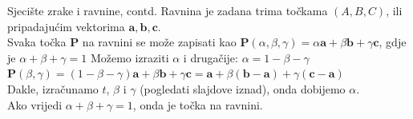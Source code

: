 \documentclass[9pt]{beamer}
\begin{document}
\begin{frame}{Sjecište zrake i ravnine, contd.}
	Ravnina je zadana trima točkama $(A, B, C)$, ili pripadajućim vektorima $\mathbf{a}, \mathbf{b}, \mathbf{c}$.\\
	Svaka točka $\mathbf{P}$ na ravnini se može zapisati kao  $\mathbf{P}(\alpha, \beta, \gamma) = \alpha\mathbf{a} + \beta\mathbf{b}+\gamma\mathbf{c}$, gdje je $\alpha + \beta +\gamma =1$
	Možemo izraziti $\alpha$ i drugačije: $\alpha = 1- \beta - \gamma$ \\
	$\mathbf{P}(\beta, \gamma) = (1- \beta - \gamma)\mathbf{a} + \beta\mathbf{b}+\gamma\mathbf{c} = \mathbf{a} + \beta(\mathbf{b}-\mathbf{a}) + \gamma(\mathbf{c}-\mathbf{a})$\\
	Dakle, izračunamo $t$, $\beta$ i $\gamma$ (pogledati slajdove iznad), onda dobijemo $\alpha$. \\
	Ako vrijedi $\alpha + \beta +\gamma =1$, onda je točka na ravnini.
\end{frame}
\end{document}
